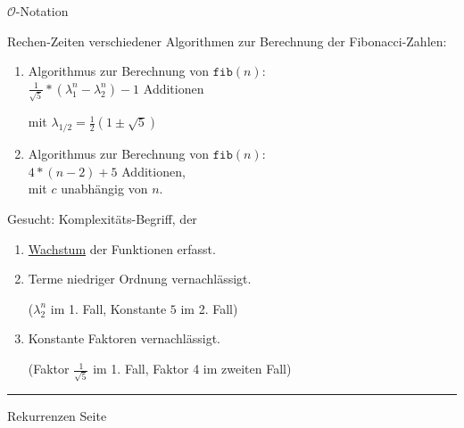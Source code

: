 \documentclass{slides}
\newcounter{mypage}
\newcommand{\bruch}[2]{\frac{\displaystyle#1}{\displaystyle#2}}
\newcommand{\Oh}{\mathcal{O}}
\begin{document}
\begin{slide}{}
\normalsize

\begin{center}
$\Oh$-Notation
\end{center}
\vspace*{0.5cm}

\footnotesize
Rechen-Zeiten  verschiedener Algorithmen zur Berechnung der Fibonacci-Zahlen:
\begin{enumerate}
\item Algorithmus zur Berechnung von $\mathtt{fib}(n)$: \\[0.3cm]
      \hspace*{1.3cm} 
      $\bruch{1}{\sqrt{5}} * (\lambda_1^n - \lambda_2^n) - 1$ Additionen

      mit $\lambda_{1/2} = \bruch{1}{2}(1 \pm \sqrt{5})$
\item Algorithmus zur Berechnung von $\mathtt{fib}(n)$: \\[0.3cm]
      \hspace*{1.3cm} 
      $4 * (n - 2) + 5$ Additionen, \\[0.3cm]
      mit $c$ unabh\"angig von $n$.
\end{enumerate}
Gesucht: Komplexit\"ats-Begriff, der
\begin{enumerate}
\item \underline{Wachstum} der Funktionen erfasst.
\item Terme niedriger Ordnung vernachl\"assigt.

      ($\lambda_2^n$ im 1. Fall, Konstante $5$ im 2. Fall)
\item Konstante Faktoren vernachl\"assigt.

      (Faktor $\bruch{1}{\sqrt{5}}$ im 1. Fall, Faktor 4 im zweiten Fall)
\end{enumerate}

\vspace*{\fill}
\tiny \addtocounter{mypage}{1}
\rule{17cm}{1mm}
Rekurrenzen  \hspace*{\fill} Seite 
\end{slide}

\end{document}
